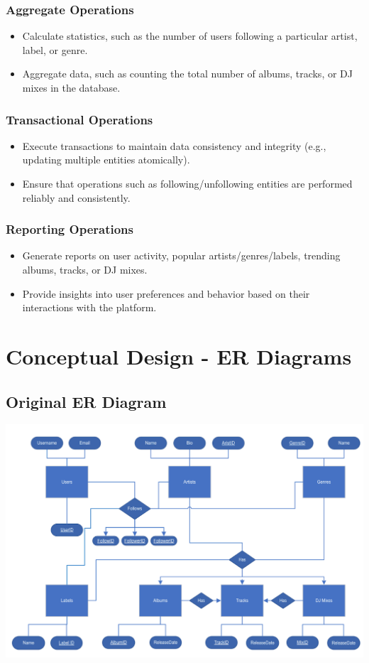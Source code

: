 \documentclass{article}
\begin{document}
\subsubsection{Aggregate Operations}
\begin{itemize}
    \item Calculate statistics, such as the number of users following a particular artist, label, or genre.
    \item Aggregate data, such as counting the total number of albums, tracks, or DJ mixes in the database.
\end{itemize}

\subsubsection{Transactional Operations}
\begin{itemize}
    \item Execute transactions to maintain data consistency and integrity (e.g., updating multiple entities atomically).
    \item Ensure that operations such as following/unfollowing entities are performed reliably and consistently.
\end{itemize}

\subsubsection{Reporting Operations}
\begin{itemize}
    \item Generate reports on user activity, popular artists/genres/labels, trending albums, tracks, or DJ mixes.
    \item Provide insights into user preferences and behavior based on their interactions with the platform.
\end{itemize}



\section{Conceptual Design - ER Diagrams}

\subsection{Original ER Diagram}
\includegraphics[width=\linewidth]{original_ER_diagram.png}
\end{document}
